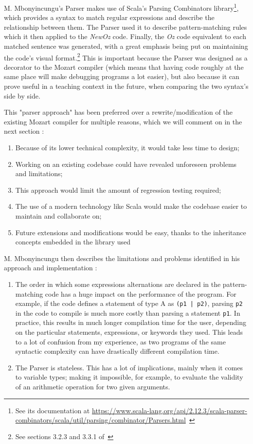 M. Mbonyincungu's Parser makes use of Scala's Parsing Combinators library\footnote{See its documentation at \url{https://www.scala-lang.org/api/2.12.3/scala-parser-combinators/scala/util/parsing/combinator/Parsers.html}~\cite{ScalaParsers}}, which provides a syntax to match regular expressions and describe the relationship between them.
The Parser used it to describe pattern-matching rules which it then applied to the \textit{NewOz} code.
Finally, the \textit{Oz} code equivalent to each matched sentence was generated, with a great emphasis being put on maintaining the code's visual format.\footnote{See sections 3.2.3 and 3.3.1 of~\cite{jpthesis}}
This is important because the Parser was designed as a decorator to the Mozart compiler (which means that having code roughly at the same place will make debugging programs a lot easier), but also because it can prove useful in a teaching context in the future, when comparing the two syntax's side by side.\newline

This "parser approach" has been preferred over a rewrite/modification of the existing Mozart compiler for multiple reasons, which we will comment on in the next section :
\begin{enumerate}
    \item Because of its lower technical complexity, it would take less time to design;
    \item Working on an existing codebase could have revealed unforeseen problems and limitations;
    \item This approach would limit the amount of regression testing required;
    \item The use of a modern technology like Scala would make the codebase easier to maintain and collaborate on;
    \item Future extensions and modifications would be easy, thanks to the inheritance concepts embedded in the library used
\end{enumerate}
M. Mbonyincungu then describes the limitations and problems identified in his approach and implementation :
\begin{enumerate}[resume]
    \item The order in which some expressions alternations are declared in the pattern-matching code has a huge impact on the performance of the program.
    For example, if the code defines a statement of type A as \texttt{(p1 | p2)}, parsing \texttt{p2} in the code to compile is much more costly than parsing a statement \texttt{p1}.
    In practice, this results in much longer compilation time for the user, depending on the particular statements, expressions, or keywords they used.
    This leads to a lot of confusion from my experience, as two programs of the same syntactic complexity can have drastically different compilation time.
    \item The Parser is stateless.
    This has a lot of implications, mainly when it comes to variable types;
    making it impossible, for example, to evaluate the validity of an arithmetic operation for two given arguments.
\end{enumerate}

